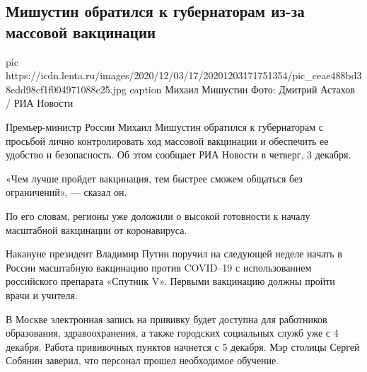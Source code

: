 
 
 
 
 
 
\subsection{Мишустин обратился к губернаторам из-за массовой вакцинации}
\label{sec:03_12_2020.news.ru.lenta_ru.3.mishustin_vaccination_russia}

\ifcmt
pic https://icdn.lenta.ru/images/2020/12/03/17/20201203171751354/pic_ceae488bd38edd98cf1f004971088c25.jpg
caption Михаил Мишустин Фото: Дмитрий Астахов / РИА Новости
\fi


Премьер-министр России Михаил Мишустин обратился к губернаторам с просьбой
лично контролировать ход массовой вакцинации и обеспечить ее удобство и
безопасность. Об этом сообщает РИА Новости в четверг, 3 декабря.

«Чем лучше пройдет вакцинация, тем быстрее сможем общаться без ограничений», —
сказал он.

По его словам, регионы уже доложили о высокой готовности к началу масштабной
вакцинации от коронавируса.

Накануне президент Владимир Путин поручил на следующей неделе начать в России
масштабную вакцинацию против COVID–19 с использованием российского препарата
«Спутник V». Первыми вакцинацию должны пройти врачи и учителя.

В Москве электронная запись на прививку будет доступна для работников
образования, здравоохранения, а также городских социальных служб уже с 4
декабря. Работа прививочных пунктов начнется с 5 декабря. Мэр столицы Сергей
Собянин заверил, что персонал прошел необходимое обучение.


